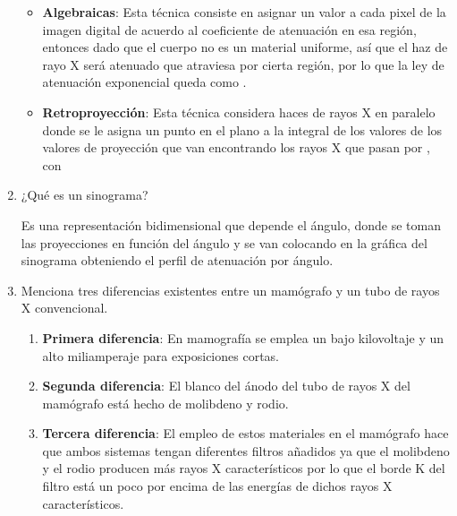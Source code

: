 \begin{enumerate}[1.]
\begin{itemize}
  \item \textbf{Algebraicas}:  Esta técnica consiste en asignar un valor a cada pixel de la imagen digital de acuerdo al coeficiente de atenuación en esa región, entonces dado que el cuerpo no es un material uniforme, así que el haz de rayo X será atenuado que atraviesa por cierta región, por lo que la ley de atenuación exponencial queda como .
  \item \textbf{Retroproyección}: Esta técnica considera haces de rayos X en paralelo donde se le asigna un punto  en el plano a la integral  de los valores de los valores de proyección que van encontrando los rayos X que pasan por , con
\end{itemize}

\item ¿Qué es un sinograma?

Es una representación bidimensional que depende el ángulo, donde se toman las proyecciones en función del ángulo y se van colocando en la gráfica del sinograma obteniendo el perfil de atenuación por ángulo.

\pagebreak

\item Menciona tres diferencias existentes entre un mamógrafo y un tubo de rayos X convencional.


\begin{enumerate}
  \item \textbf{Primera diferencia}: En mamografía se emplea un bajo kilovoltaje y un alto miliamperaje para exposiciones cortas.
  \item \textbf{Segunda diferencia}: El blanco del ánodo del tubo de rayos X del mamógrafo está hecho de molibdeno y rodio.
  \item \textbf{Tercera diferencia}: El empleo de estos materiales en el mamógrafo hace que ambos sistemas tengan diferentes filtros añadidos ya que el molibdeno y el rodio producen más rayos X característicos por lo que el borde K del filtro está un poco por encima de las energías de dichos rayos X característicos.
\end{enumerate}



\end{enumerate}
